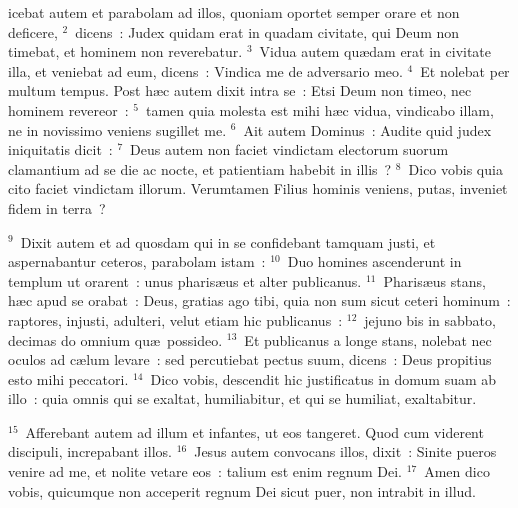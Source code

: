 \bchapter
{}icebat autem et parabolam ad illos, quoniam oportet semper orare et non deficere,
${}^{2}$~dicens~: Judex quidam erat in quadam civitate, qui Deum non timebat, et hominem non reverebatur.
${}^{3}$~Vidua autem qu\ae dam erat in civitate illa, et veniebat ad eum, dicens~: Vindica me de adversario meo.
${}^{4}$~Et nolebat per multum tempus. Post h\ae c autem dixit intra se~: Etsi Deum non timeo, nec hominem revereor~:
${}^{5}$~tamen quia molesta est mihi h\ae c vidua, vindicabo illam, ne in novissimo veniens sugillet me.
${}^{6}$~Ait autem Dominus~: Audite quid judex iniquitatis dicit~:
${}^{7}$~Deus autem non faciet vindictam electorum suorum clamantium ad se die ac nocte, et patientiam habebit in illis~?
${}^{8}$~Dico vobis quia cito faciet vindictam illorum. Verumtamen Filius hominis veniens, putas, inveniet fidem in terra~?


${}^{9}$~Dixit autem et ad quosdam qui in se confidebant tamquam justi, et aspernabantur ceteros, parabolam istam~:
${}^{10}$~Duo homines ascenderunt in templum ut orarent~: unus pharis\ae us et alter publicanus.
${}^{11}$~Pharis\ae us stans, h\ae c apud se orabat~: Deus, gratias ago tibi, quia non sum sicut ceteri hominum~: raptores, injusti, adulteri, velut etiam hic publicanus~:
${}^{12}$~jejuno bis in sabbato, decimas do omnium qu\ae\ possideo.
${}^{13}$~Et publicanus a longe stans, nolebat nec oculos ad c\ae lum levare~: sed percutiebat pectus suum, dicens~: Deus propitius esto mihi peccatori.
${}^{14}$~Dico vobis, descendit hic justificatus in domum suam ab illo~: quia omnis qui se exaltat, humiliabitur, et qui se humiliat, exaltabitur.


${}^{15}$~Afferebant autem ad illum et infantes, ut eos tangeret. Quod cum viderent discipuli, increpabant illos.
${}^{16}$~Jesus autem convocans illos, dixit~: Sinite pueros venire ad me, et nolite vetare eos~: talium est enim regnum Dei.
${}^{17}$~Amen dico vobis, quicumque non acceperit regnum Dei sicut puer, non intrabit in illud.


